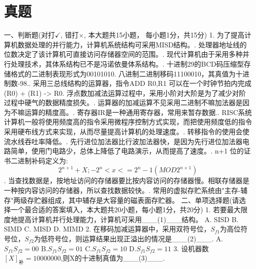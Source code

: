 \section{真题}
一、判断题(对打$\checkmark$, 错打$\times$, 本大题共15小题， 每小题1分，共15分)
1. 为了提高计算机数据处理的并行能力，计算机系统结构可采用MISD结构。. 处理器地址线的位数决定了该计算机可直接访问存储器空间的范围。. 现代计算机由于采用多种并行处理技术，其体系结构已不是冯诺依曼体系结构。. 十进制29的BCD码压缩型存储格式的二进制表现形式为00101010. 八进制二进制移码11100010，其真值为十进制数-98.. 采用三总线结构的运算器，指令ADD R0,R1 可以在一个时钟节拍内完成 (R0) + (R1) -> R0. 浮点数加减法运算过程中，采用小阶对大阶是为了减少对阶过程中硬气的数据精度损失。. 运算器的加减运算不见采用二进制不嘛加法器是因为不嘛运算的精度高。. 寄存器IR是一种通用寄存器，常用来暂存数据.. RISC系统计算机一般将使用频度高的指令采用微程序控制方式实现，而把使用频度低的指令采用硬布线方式来实现，从而尽量提高计算机的处理速度。. 转移指令的使用会使流水线吞吐率降低。. 先行进位加法器比行波加法器快，是因为先行进位加法器电路简单，使用门电路少，总体上降低了电路演示，从而提高了速度。. n+1 位的证书二进制补码定义为:$$2^{n+1} + X; -2^n < x <= 2^n -1 (MOD2^{n+1})$$. 当查找数据是，按地址访问的存储器要比按内容访问的存储器慢。相联存储器是一种按内容访问的存储器，所以查找数据较快。. 常用的虚拟存贮系统由"主存-辅存"两级存贮器组成，其中辅存是大容量的磁表面存贮器。
二、单项选择题(请选择一个最合适的答案填入，本大题共20小题，每小题1分，共20分)
1. 若要最大限度地提高计算机并行处理能力，计算机可采用\_\_\_(1)\_\_\_结构。\newline
A. SISD                   B. SIMD
C. MISD                   D. MIMD
2. 在移码加减运算器中，采用双符号位，$S_{f1}$为高位符号位，$S_{f2}$为低符号位，则运算结果出现正溢出的情况是\_\_\_(2)\_\_\_.
A.$S_{f1}S_{f2}=00$ B.$S_{f1}S_{f2}=01$ C.$S_{f1}S_{f2}=10$ D.$S_{f1}S_{f2}=11$
3. 设机器数$[X]_{\mbox{补}}=10000000$,则X的十进制真值为\_\_\_(3)\_\_\_.

